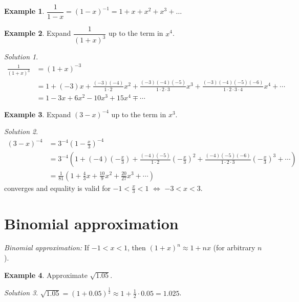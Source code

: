 \documentclass[
  english,
  12pt,
  oneside]{book}
\theoremstyle{definition}
\theoremstyle{definition}
\newtheorem{example}{Example}[chapter]
\theoremstyle{definition}
\theoremstyle{definition}
\theoremstyle{remark}
\newtheorem*{solution}{Solution}
\begin{document}
\begin{example}
\(\dfrac{1}{1-x} = (1-x)^{-1} = 1+x+x^2+x^3+\dots\)
\end{example}

\begin{example}
Expand \(\dfrac{1}{(1+x)^3}\) up to the term in \(x^4\).
\end{example}

\begin{solution}
\begin{align*}
\frac{1}{(1+x)^3} &= (1+x)^{-3}\\
&= 1+(-3)x+\frac{(-3)(-4)}{1\cdot 2}x^2 + \frac{(-3)(-4)(-5)}{1\cdot 2\cdot 3}x^3 + \frac{(-3)(-4)(-5)(-6)}{1\cdot 2\cdot 3\cdot 4}x^4 + \cdots\\
&=1-3x+6x^2-10x^3+15x^4 \mp \cdots
\end{align*}
\end{solution}

\begin{example}
Expand \((3-x)^{-4}\) up to the term in \(x^3\).
\end{example}

\begin{solution}
\begin{align*}
(3-x)^{-4} &= 3^{-4}\left(1-\frac{x}{3}\right)^{-4}\\
&= 3^{-4}\left(1+(-4)\left(-\frac{x}{3}\right)
+\frac{(-4)(-5)}{1\cdot 2}\left(-\frac{x}{3}\right)^2 + \frac{(-4)(-5)(-6)}{1\cdot 2\cdot 3}\left(-\frac{x}{3}\right)^3+\cdots\right)\\
&= \frac{1}{81}\left(1+\frac{4}{3}x+\frac{10}{9}x^2+\frac{20}{27}x^3+\cdots\right)
\end{align*}
converges and equality is valid for \(-1<\frac{x}{3}<1\) \(\iff\) \(-3<x<3\).
\end{solution}

\section{Binomial approximation}\label{binomial-approximation}

\emph{Binomial approximation:} If \(-1<x<1\), then \((1+x)^n \approx 1+nx\) (for arbitrary \(n\)).

\begin{example}
Approximate \(\sqrt{1.05}\).
\end{example}

\begin{solution}
\(\sqrt{1.05} = (1+0.05)^{\frac12} \approx 1+\frac12\cdot0.05 = 1.025\).
\end{solution}
\end{document}
